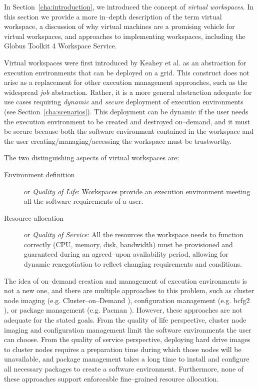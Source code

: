 \label{sec:vw}

In Section~\ref{cha:introduction}, we introduced the concept of \emph{virtual workspaces}. In this section we provide a more in--depth description of the term virtual workspace, a discussion of why virtual machines are a promising vehicle for virtual workspaces, and approaches to implementing workspaces, including the Globus Toolkit 4 Workspace Service.

Virtual workspaces were first introduced by Keahey et al.\cite{VirtualWorkspaces05} as an abstraction for execution environments that can be deployed on a grid. This construct does not arise as a replacement for other execution management approaches, such as the widespread \emph{job} abstraction. Rather, it is a more general abstraction adequate for use cases requiring \emph{dynamic} and \emph{secure} deployment of execution environments (see Section~\ref{cha:scenarios}). This deployment can be dynamic if the user needs the execution environment to be created and destroyed on--demand, and it must be secure because both the software environment contained in the workspace and the user creating/managing/accessing the workspace must be trustworthy.

The two distinguishing aspects of virtual workspaces are:

\begin{description}
\item[Environment definition] or \emph{Quality of Life}: Workspaces provide an execution environment meeting all the software requirements of a user.
\item[Resource allocation] or \emph{Quality of Service}: All the resources the workspace needs to function correctly (CPU, memory, disk, bandwidth) must be provisioned and guaranteed during an agreed--upon availability period, allowing for dynamic renegotiation to reflect changing requirements and conditions.
\end{description}

The idea of on--demand creation and management of execution environments is not a new one, and there are multiple approaches to this problem, such as cluster node imaging (e.g. Cluster--on--Demand \cite{codweb}), configuration management (e.g. bcfg2 \cite{bcfg2web}), or package management (e.g. Pacman \cite{pacmanweb}). However, these approaches are not adequate for the stated goals. From the quality of life perspective, cluster node imaging and configuration management limit the software environments the user can choose. From the quality of service perspective, deploying hard drive images to cluster nodes requires a preparation time during which those nodes will be unavailable, and package management takes a long time to install and configure all necessary packages to create a software environment. Furthermore, none of these approaches support enforceable fine--grained resource allocation.


